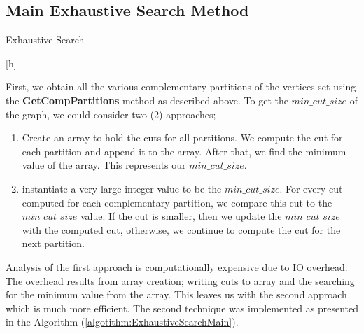 \documentclass[longpaper, english, final, times]{revdetua}
\begin{document}
		\subsection{Main Exhaustive Search Method}
			\begin{algorithm}[h]
				\caption{Exhaustive Search}[h]
				\label{algotithm:ExhaustiveSearchMain}
				\DontPrintSemicolon
				
				
			\end{algorithm}
		
		
			First, we obtain all the various complementary partitions of the vertices set using the \textbf{GetCompPartitions} method as described above. To get the $min\_cut\_size$ of the graph, we could consider two (2) approaches;
			\begin{enumerate}[label=(\arabic*)]
				\item Create an array to hold the cuts for all partitions. We compute the cut for each partition and append it to the array. After that, we find the minimum value of the array. This represents our $min\_cut\_size$.
				\item instantiate a very large integer value to be the $min\_cut\_size$. For every cut computed for each complementary partition, we compare this cut to the $min\_cut\_size$ value. If the cut is smaller, then we update the $min\_cut\_size$ with the computed cut, otherwise, we continue to compute the cut for the next partition.
			\end{enumerate}
			Analysis of the first approach is computationally expensive due to IO overhead. The overhead results from array creation; writing cuts to array and the searching for the minimum value from the array. This leaves us with the second approach which is much more efficient. The second technique was implemented as presented in the Algorithm (\ref{algotithm:ExhaustiveSearchMain}).\\
			
\end{document}
